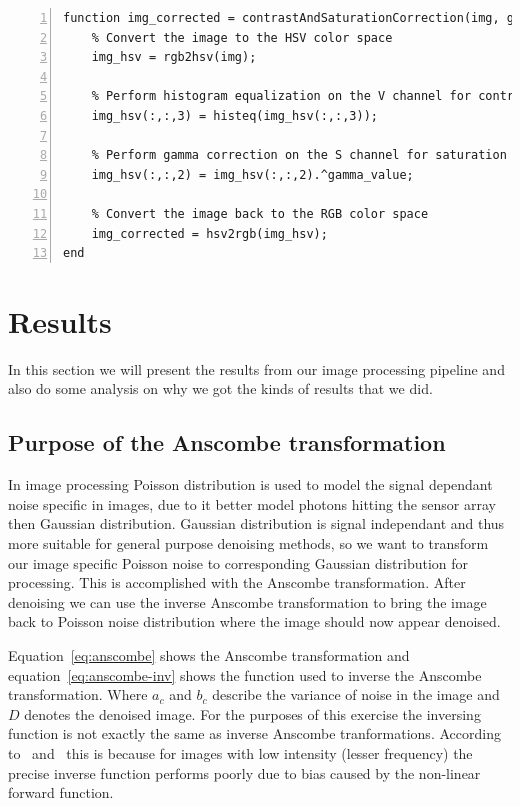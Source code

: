 \documentclass[12pt,a4paper,english
]{tunithesis}
\begin{document}
\begin{lstlisting}[style=Matlab-editor, numbers=left, basicstyle=\small]
function img_corrected = contrastAndSaturationCorrection(img, gamma_value)
    % Convert the image to the HSV color space
    img_hsv = rgb2hsv(img);

    % Perform histogram equalization on the V channel for contrast correction
    img_hsv(:,:,3) = histeq(img_hsv(:,:,3));

    % Perform gamma correction on the S channel for saturation correction
    img_hsv(:,:,2) = img_hsv(:,:,2).^gamma_value;

    % Convert the image back to the RGB color space
    img_corrected = hsv2rgb(img_hsv);
end
\end{lstlisting}


\chapter{Results}
\label{sec:results}
In this section we will present the results from our image processing pipeline and also do some analysis on why we got the kinds of results that we did.


\section{Purpose of the Anscombe transformation}
In image processing Poisson distribution is used to model the signal dependant noise specific in images, due to it better model photons hitting the sensor array then Gaussian distribution. Gaussian distribution is signal independant and thus more suitable for general purpose denoising methods, so we want to transform our image specific Poisson noise to corresponding Gaussian distribution for processing. This is accomplished with the Anscombe transformation. After denoising we can use the inverse Anscombe transformation to bring the image back to Poisson noise distribution where the image should now appear denoised.

Equation~\ref{eq:anscombe} shows the Anscombe transformation and equation~\ref{eq:anscombe-inv} shows the function used to inverse the Anscombe transformation. Where $a_{c}$ and $b_{c}$ describe the variance of noise in the image and $D$ denotes the denoised image. For the purposes of this exercise the inversing function is not exactly the same as inverse Anscombe tranformations. According to~\cite{poissonnoise2011} and~\cite{poissonnoise2011-2} this is because for images with low intensity (lesser frequency) the precise inverse function performs poorly due to bias caused by the non-linear forward function.
\end{document}
